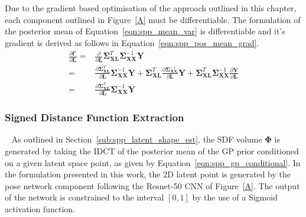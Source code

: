 Due to the gradient based optimisation of the approach outlined in this chapter, each 
component outlined in Figure~\ref{A} must be differentiable. The formulation of the 
posterior mean of Equation~\ref{eqn:spp_mean_var} is differentiable and it's gradient 
is derived as follows in Equation~\ref{eqn:spp_pos_mean_grad}.
\begin{align}
  \label{eqn:spp_pos_mean_grad}
  \frac{\partial \bm{f}^{\star}}{\partial \bm{L}} ={}&
  \frac{\partial}{\partial \bm{L}}
  \bm{\Sigma}_{\bm{XL}}^{T} \bm{\Sigma}_{\bm{XX}}^{-1} \bm{Y}\\
  ={}& \frac{\partial \bm{\Sigma}_{\bm{XL}}^{T}}{\partial \bm{L}}
  \bm{\Sigma}_{\bm{XX}}^{-1} \bm{Y}
  + \bm{\Sigma}_{\bm{XL}}^{T} 
  \frac{\partial\bm{\Sigma}_{\bm{XX}}^{-1}}{\partial \bm{L}} \bm{Y}
  + \bm{\Sigma}_{\bm{XL}}^{T} \bm{\Sigma}_{\bm{XX}}^{-1} 
  \frac{\partial \bm{Y}}{\partial \bm{L}}\\
  ={}& \frac{\partial \bm{\Sigma}_{\bm{XL}}^{T}}{\partial \bm{L}}
  \bm{\Sigma}_{\bm{XX}}^{-1} \bm{Y}
\end{align}

\subsubsection{Signed Distance Function Extraction}
~\label{subsubsec:sdf_extraction}
As outlined in Section~\ref{sub:spp_latent_shape_est}, the SDF volume \( \bm{\Phi} \) 
is generated by taking the IDCT of the posterior mean of the GP prior conditioned on 
a given latent space point, as given by Equation~\ref{eqn:spp_gp_conditional}. In the 
formulation presented in this work, the 2D latent point is generated by the pose 
network component following the Resnet-50 CNN of Figure~\ref{A}. The output of the network 
is constrained to the interval \( [0, 1] \) by the use of a Sigmoid activation function.

